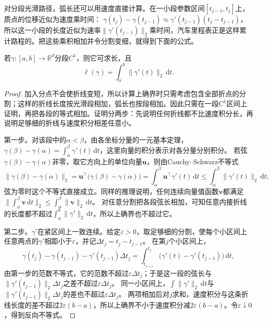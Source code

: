 对分段光滑路径，弧长还可以用速度直接计算。在一小段参数区间$[t_{j-1},t_j]$上，质点的位移近似为速度乘时间：
$\gamma(t_j)-\gamma(t_{j-1})\approx\gamma'(t_{j-1})(t_j-t_{j-1})$，
所以这一小段的长度近似为速率$\lVert\gamma'(t_{j-1})\rVert_2$乘时间，汽车里程表正是这样累计路程的。把这些乘积相加并令分割变细，就得到下面的公式。
\begin{theorem}[分段光滑路径的弧长]
若$\gamma:[a,b]\to\mathbb R^d$分段$C^1$，则它可求长，且
\[
 \ell(\gamma)=\int_a^b\lVert\gamma'(t)\rVert_2\,\mathrm dt.
\]
\end{theorem}
\begin{proof}
加入分点不会使折线变短，所以计算上确界时只需考虑包含全部折点的分割；这样的折线长度按光滑段相加，弧长也按段相加。因此只需在一段$C^1$区间上证明，再把各段的等式相加。证明分两步：先说明任何折线都不比速度积分长，再说明足够细的折线与速度积分相差任意小。

第一步。对该段中的$\alpha<\beta$，由各坐标分量的一元基本定理，
$\gamma(\beta)-\gamma(\alpha)=\int_\alpha^\beta\gamma'(t)\,\mathrm dt$，这里向量的积分表示对各分量分别积分。
若弦$\gamma(\beta)-\gamma(\alpha)$非零，取它方向上的单位向量$\bm u$，则由Cauchy--Schwarz不等式
\[
 \lVert\gamma(\beta)-\gamma(\alpha)\rVert_2
 =\bm u^\top\bigl(\gamma(\beta)-\gamma(\alpha)\bigr)
 =\int_\alpha^\beta\bm u^\top\gamma'(t)\,\mathrm dt
 \leq\int_\alpha^\beta\lVert\gamma'(t)\rVert_2\,\mathrm dt;
\]
弦为零时这个不等式直接成立。同样的推理说明，任何连续向量值函数$\bm v$都满足$\lVert\int_\alpha^\beta\bm v\,\mathrm dt\rVert_2\leq\int_\alpha^\beta\lVert\bm v\rVert_2\,\mathrm dt$。
对任意分割把各段弦长相加，可知任意内接折线的长度都不超过$\int_a^b\lVert\gamma'\rVert_2\,\mathrm dt$，所以上确界也不超过它。

第二步。$\gamma'$在紧区间上一致连续。给定$\varepsilon>0$，取足够细的分割，使每个小区间上任意两点的$\gamma'$相距小于$\varepsilon$，并记$\Delta t_j=t_j-t_{j-1}$。
在第$j$个小区间上，
\[
 \gamma(t_j)-\gamma(t_{j-1})-\gamma'(t_{j-1})\Delta t_j
 =\int_{t_{j-1}}^{t_j}\bigl(\gamma'(t)-\gamma'(t_{j-1})\bigr)\,\mathrm dt,
\]
由第一步的范数不等式，它的范数不超过$\varepsilon\Delta t_j$；于是这一段的弦长与$\lVert\gamma'(t_{j-1})\rVert_2\Delta t_j$之差不超过$\varepsilon\Delta t_j$。
同一小区间上，$\int\lVert\gamma'\rVert_2\,\mathrm dt$与$\lVert\gamma'(t_{j-1})\rVert_2\Delta t_j$的差也不超过$\varepsilon\Delta t_j$。
两项相加后对$j$求和，速度积分与这条折线长度的差不超过$2\varepsilon(b-a)$，所以上确界不小于速度积分减$2\varepsilon(b-a)$。令$\varepsilon\downarrow0$，得到反向不等式。
\end{proof}

